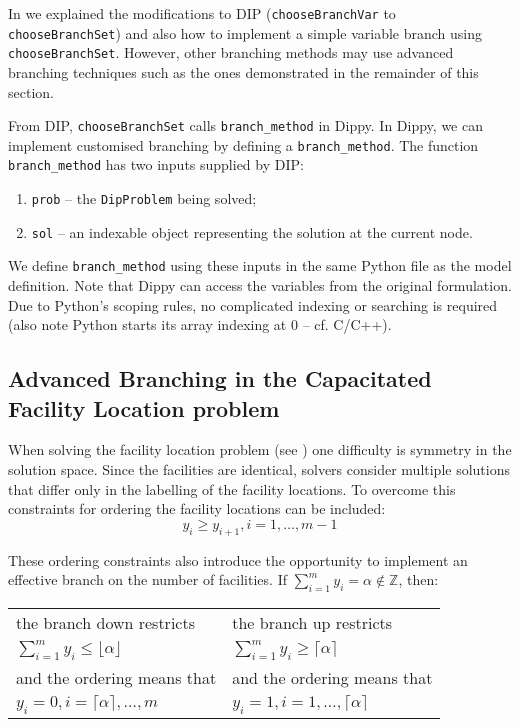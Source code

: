 In  we explained the modifications to \ac{DIP} (\texttt{chooseBranchVar} to \\ \texttt{chooseBranchSet}) and also how to implement a simple variable branch using \texttt{chooseBranchSet}. However, other branching methods may use advanced branching techniques such as the ones demonstrated in the remainder of this section.

From \ac{DIP}, \texttt{chooseBranchSet} calls \texttt{branch\_method} in Dippy. In Dippy, we can implement customised branching by defining a \texttt{branch\_method}. The function \texttt{branch\_method} has two inputs supplied by \ac{DIP}:
\begin{enumerate}
\item \texttt{prob} -- the \texttt{DipProblem} being solved;
\item \texttt{sol} -- an indexable object representing the solution at the current node.
\end{enumerate}
We define \texttt{branch\_method} using these inputs in the same Python file as the model definition. Note that Dippy can access the variables from the original formulation. Due to Python's scoping rules, no complicated indexing or searching is required (also note Python starts its array indexing at 0 -- cf. C/C++).

\subsection{Advanced Branching in the Capacitated Facility Location problem} \label{sbs:fac_brch}

When solving the facility location problem (see ) one difficulty is symmetry in the solution space. Since the facilities are identical, solvers consider multiple solutions that differ only in the labelling of the facility locations. To overcome this constraints for ordering the facility locations can be included:
\[ y_i \geq y_{i+1}, i = 1, \ldots, m-1 \]


These ordering constraints also introduce the opportunity to implement an effective branch on the number of facilities. If $\displaystyle\sum_{i=1}^m y_i = \alpha \notin \mathbb{Z}$, then:
\vspace*{-6pt}
\begin{center}
\begin{tabular}{l|l}
the branch down restricts & the branch up restricts \\
$\displaystyle\sum_{i=1}^m y_i \leq \lfloor \alpha \rfloor$ &
$\displaystyle\sum_{i=1}^m y_i \geq \lceil \alpha \rceil$ \\
and the ordering means that & and the ordering means that \\
$y_i = 0, i = \lceil \alpha \rceil, \ldots, m$ &
$y_i = 1, i = 1, \ldots, \lceil \alpha \rceil$
\end{tabular}
\end{center}

